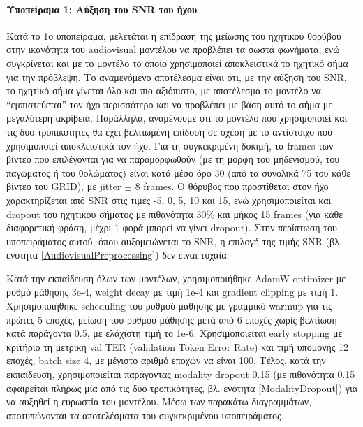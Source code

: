 \paragraph{Υποπείραμα 1: Αύξηση του SNR του ήχου}
\label{SNRExperiment}

Κατά το 1ο υποπείραμα, μελετάται η επίδραση της μείωσης του ηχητικού θορύβου στην ικανότητα του audiovisual μοντέλου να προβλέπει τα σωστά φωνήματα, ενώ συγκρίνεται και με το μοντέλο το οποίο χρησιμοποιεί αποκλειστικά το ηχητικό σήμα για την πρόβλεψη. Το αναμενόμενο αποτέλεσμα είναι ότι, με την αύξηση του SNR, το ηχητικό σήμα γίνεται όλο και πιο αξιόπιστο, με αποτέλεσμα το μοντέλο να ``εμπιστεύεται'' τον ήχο περισσότερο και να προβλέπει με βάση αυτό το σήμα με μεγαλύτερη ακρίβεια. Παράλληλα, αναμένουμε ότι το μοντέλο που χρησιμοποιεί και τις δύο τροπικότητες θα έχει βελτιωμένη επίδοση σε σχέση με το αντίστοιχο που χρησιμοποιεί αποκλειστικά τον ήχο. Για τη συγκεκριμένη δοκιμή, τα frames των βίντεο που επιλέγονται για να παραμορφωθούν (με τη μορφή του μηδενισμού, του παγώματος ή του θολώματος) είναι κατά μέσο όρο 30 (από τα συνολικά 75 του κάθε βίντεο του GRID), με jitter $\pm$ 8 frames. Ο θόρυβος που προστίθεται στον ήχο χαρακτηρίζεται από SNR στις τιμές -5, 0, 5, 10 και 15, ενώ χρησιμοποιείται και dropout του ηχητικού σήματος με πιθανότητα 30\% και μήκος 15 frames (για κάθε διαφορετική φράση, μέχρι 1 φορά μπορεί να γίνει dropout). Στην περίπτωση του υποπειράματος αυτού, όπου αυξομειώνεται το SNR, η επιλογή της τιμής SNR (βλ. ενότητα \ref{AudiovisualPreprocessing}) δεν είναι τυχαία.

Κατά την εκπαίδευση όλων των μοντέλων, χρησιμοποιήθηκε AdamW optimizer με ρυθμό μάθησης 3e-4, weight decay με τιμή 1e-4 και gradient clipping με τιμή 1. Χρησιμοποιήθηκε scheduling του ρυθμού μάθησης με γραμμικό warmup για τις πρώτες 5 εποχές, μείωση του ρυθμού μάθησης μετά από 6 εποχές χωρίς βελτίωση κατά παράγοντα 0.5, με ελάχιστη τιμή το 1e-6.  Χρησιμοποιείται early stopping με κριτήριο τη μετρική val TER (validation Token Error Rate) και τιμή υπομονής 12 εποχές, batch size 4, με μέγιστο αριθμό εποχών να είναι 100. Τέλος, κατά την εκπαίδευση, χρησιμοποιείται παράγοντας modality dropout 0.15 (με πιθανότητα 0.15 αφαιρείται πλήρως μία από τις δύο τροπικότητες, βλ. ενότητα \ref{ModalityDropout}) για να αυξηθεί η ευρωστία του μοντέλου. Μέσω των παρακάτω διαγραμμάτων, αποτυπώνονται τα αποτελέσματα του συγκεκριμένου υποπειράματος.

